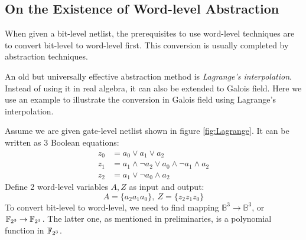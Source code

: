 \subsection{On the Existence of Word-level Abstraction}
When given a bit-level netlist, the prerequisites to use word-level techniques are to convert bit-level 
to word-level first. This conversion is usually completed by abstraction techniques.

An old but universally effective abstraction method is {\it Lagrange's interpolation}. Instead of using 
it in real algebra, it can also be extended to Galois field. Here we use an example to illustrate the 
conversion in Galois field using Lagrange's interpolation.

\begin{Example}

\begin{figure}[H]
\end{figure}

Assume we are given gate-level netlist shown in figure \ref{fig:Lagrange}. It can be written as 3 
Boolean equations:
\begin{align*}
z_0 &= a_0 \lor a_1 \lor a_2 \\
z_1 &= a_1 \land \neg a_2 \lor a_0 \land \neg a_1 \land a_2 \\
z_2 &= a_1 \lor \neg a_0 \land a_2
\end{align*}
Define 2 word-level variables $A,Z$ as input and output:
$$A = \{a_2a_1a_0\},~Z = \{z_2z_1z_0\}$$
To convert bit-level to word-level, we need to find mapping $\mathbb{B}^3 \rightarrow \mathbb{B}^3$,
or ${\mathbb{F}}_{2^3} \rightarrow {\mathbb{F}}_{2^3}$. The latter one, as mentioned in preliminaries, is a polynomial
function in ${\mathbb{F}}_{2^3}$.


\end{Example}
